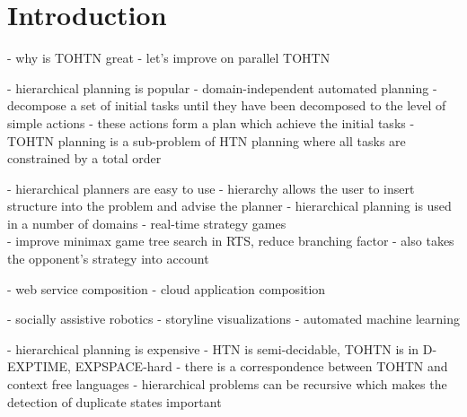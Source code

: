 \documentclass[enabledeprecatedfontcommands,12pt,a4paper,twoside]{scrartcl}
\numberwithin{equation}{section}
\begin{document}
\clearpage


\listoffigures
\listoftables
\listofalgorithms

\clearpage


\section{Introduction}
- why is TOHTN great
- let's improve on parallel TOHTN

- hierarchical planning is popular
- domain-independent automated planning
- decompose a set of initial tasks until they have been decomposed to the level of simple actions
- these actions form a plan which achieve the initial tasks
- TOHTN planning is a sub-problem of HTN planning where all tasks are constrained by a total order

- hierarchical planners are easy to use
- hierarchy allows the user to insert structure into the problem and advise the planner
- hierarchical planning is used in a number of domains
	- \cite{munoz2004role} real-time strategy games\\
	- \cite{ontanon2015adversarial} improve minimax game tree search in RTS, reduce branching factor
	- \cite{lin2020htn} also takes the opponent's strategy into account
	
	- \cite{sirin2004htn} web service composition
	- \cite{georgievski2017cloud} cloud application composition
	
	- \cite{gonzalez2017three} socially assistive robotics
	- \cite{padia2018yarn} storyline visualizations
	- \cite{mohr2018ml} automated machine learning

- hierarchical planning is expensive \cite{erol1994htn}
- HTN is semi-decidable, TOHTN is in D-EXPTIME, EXPSPACE-hard \cite{erol1996complexity}
- there is a correspondence between TOHTN and context free languages
- hierarchical problems can be recursive which makes the detection of duplicate states important
\end{document}
